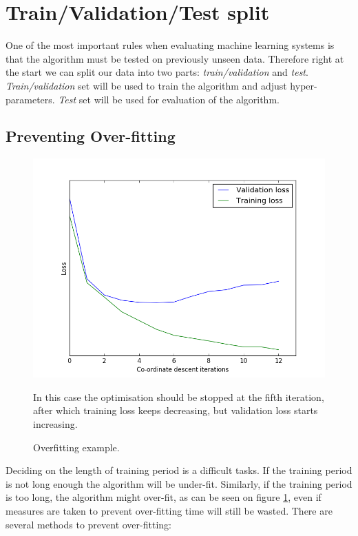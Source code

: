 \documentclass[12pt,a4paper]{book}
\newcommand\note[1]{\vspace*{-0.5\baselineskip}\caption*{#1}}
\begin{document}
\section{Train/Validation/Test split}
One of the most important rules when evaluating machine learning systems is that the algorithm must be tested on previously unseen data.
Therefore right at the start we can split our data into two parts: \emph{train/validation} and \emph{test}.
\emph{Train/validation} set will be used to train the algorithm and adjust hyper-parameters.
\emph{Test} set will be used for evaluation of the algorithm.

\subsection{Preventing Over-fitting}
\begin{figure}[ht]
\centering
\includegraphics[scale=0.5]{overfitting}
\caption{Overfitting example.}
\note{In this case the optimisation should be stopped at the fifth iteration, after which training loss keeps decreasing, but validation loss starts increasing.}
\label{fig:overfitting}
\end{figure}
Deciding on the length of training period is a difficult tasks.
If the training period is not long enough the algorithm will be under-fit.
Similarly, if the training period is too long, the algorithm might over-fit, as can be seen on figure \ref{fig:overfitting}, even if measures are taken to prevent over-fitting time will still be wasted.
There are several methods to prevent over-fitting:
\end{document}
